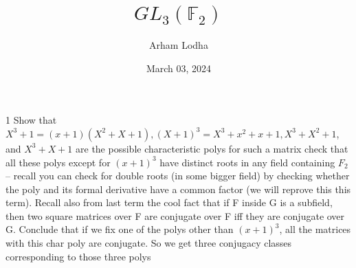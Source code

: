 \documentclass{article}
\newcommand*{\F}{\mathbb{F}}
\begin{document}
\title{$GL_3(\F_2)$}
\author{Arham Lodha}%
\date{March 03, 2024}%
\maketitle

\begin{PROB}{1}\label{Problem 1.}
    Show that $X^3 +1 = (x +1)(X^2 + X + 1), (X + 1)^3 = X^3 + x^2 + x + 1, X^3 + X^2 + 1$, and $X^3 + X + 1$ are the possible characteristic polys for such a matrix check that all these polys except for $(x+1)^3$ have distinct roots in any field containing $F_2$ -- recall you can check for double roots (in some bigger field) by checking whether the poly and its formal derivative have a common factor (we will reprove this this term). Recall also from last term the cool fact that if F inside G is a subfield, then two square matrices over F are conjugate over F iff they are conjugate over G. Conclude that if we fix one of the polys other than $(x+1)^3$, all the matrices with this char poly are conjugate.  So we get three conjugacy classes corresponding to those three polys
\end{PROB}
\end{document}
